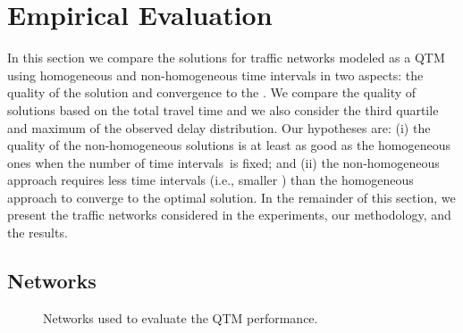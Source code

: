 \section{Empirical Evaluation}
  
In this section we compare the solutions for traffic networks modeled as a QTM
using homogeneous and non-homogeneous time intervals in two aspects:
%
the quality of the solution and convergence to the .
%
We compare the quality of solutions based on the total travel time and we also
consider the third quartile and maximum of the observed delay distribution.
%
%
%
Our hypotheses are:
%
(i) the quality of the non-homogeneous solutions is at least as good as the
homogeneous ones when the number of time intervals~\Nn is fixed; and 
%
(ii) the non-homogeneous approach requires less time intervals (i.e., smaller
\Nn) than the homogeneous approach to converge to the optimal solution.
%
In the remainder of this section, we present the traffic networks considered in
the experiments, our methodology, and the results.



\subsection{Networks}


\begin{figure*}[t!]
\centering
\caption{Networks used to evaluate the QTM performance. }
\label{fig:networks}
\end{figure*}


